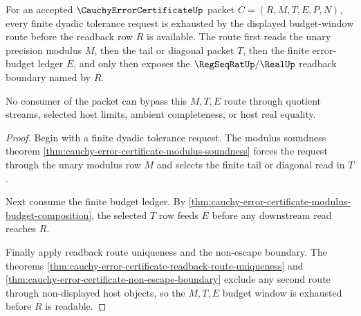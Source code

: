 \begin{theorem}
\label{thm:cauchy-error-certificate-budget-window-exhaustion}
For an accepted $\CauchyErrorCertificateUp$ packet $C=(R,M,T,E,P,N)$, every finite dyadic tolerance request is exhausted by the displayed budget-window route before the readback row $R$ is available. The route first reads the unary precision modulus $M$, then the tail or diagonal packet $T$, then the finite error-budget ledger $E$, and only then exposes the $\RegSeqRatUp/\RealUp$ readback boundary named by $R$.

No consumer of the packet can bypass this $M,T,E$ route through quotient streams, selected host limits, ambient completeness, or host real equality.
\end{theorem}
\begin{proof}
Begin with a finite dyadic tolerance request. The modulus soundness theorem \autoref{thm:cauchy-error-certificate-modulus-soundness} forces the request through the unary modulus row $M$ and selects the finite tail or diagonal read in $T$.

Next consume the finite budget ledger. By \autoref{thm:cauchy-error-certificate-modulus-budget-composition}, the selected $T$ row feeds $E$ before any downstream read reaches $R$.

Finally apply readback route uniqueness and the non-escape boundary. The theorems \autoref{thm:cauchy-error-certificate-readback-route-uniqueness} and \autoref{thm:cauchy-error-certificate-non-escape-boundary} exclude any second route through non-displayed host objects, so the $M,T,E$ budget window is exhausted before $R$ is readable.
\end{proof}

